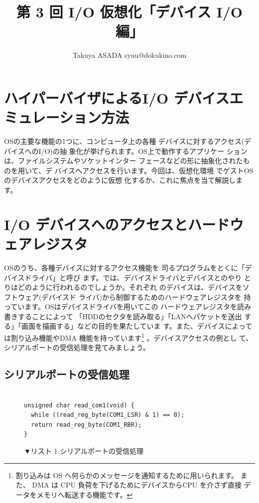 
\title{第 3 回 I/O 仮想化「デバイス I/O 編」}
\author{Takuya ASADA syuu@dokukino.com}

\maketitle

\section{ハイパーバイザによるI/O デバイスエミュレーション方法}

 OSの主要な機能の1つに、コンピュータ上の各種
デバイスに対するアクセス(デバイスへのI/O)の抽
象化が挙げられます。OS上で動作するアプリケー
ションは、ファイルシステムやソケットインター
フェースなどの形に抽象化されたものを用いて、デ
バイスへアクセスを行います。今回は、仮想化環境
でゲストOSのデバイスアクセスをどのように仮想
化するか、これに焦点を当て解説します。


\section{I/O デバイスへのアクセスとハードウェアレジスタ}

 OSのうち、各種デバイスに対するアクセス機能を
司るプログラムをとくに「デバイスドライバ」と呼び
ます。では、デバイスドライバとデバイスとのやり
とりはどのように行われるのでしょうか。それぞれ
のデバイスは、デバイスをソフトウェア(デバイスド
ライバ)から制御するためのハードウェアレジスタを
持っています。OSはデバイスドライバを用いてこの
ハードウェアレジスタを読み書きすることによって
「HDDのセクタを読み取る」「LANへパケットを送出
する」「画面を描画する」などの目的を果たしていま
す。また、デバイスによっては割り込み機能やDMA
機能を持っています\footnote[1]{
割り込みは OS へ何らかのメッセージを通知するために用いられます。
また、 DMA は CPU 負荷を下げるためにデバイスからCPU を介さず直接
データをメモリへ転送する機能です。
}
。デバイスアクセスの例とし
て、シリアルポートの受信処理を見てみましょう。

\subsection{シリアルポートの受信処理}

\begin{figure}\centering
\begin{verbatim}

unsigned char read_com1(void) {
  while ((read_reg_byte(COM1_LSR) & 1) == 0);
  return read_reg_byte(COM1_RBR);
}

\end{verbatim}
\caption{▼リスト 1  シリアルポートの受信処理}
\end{figure}


